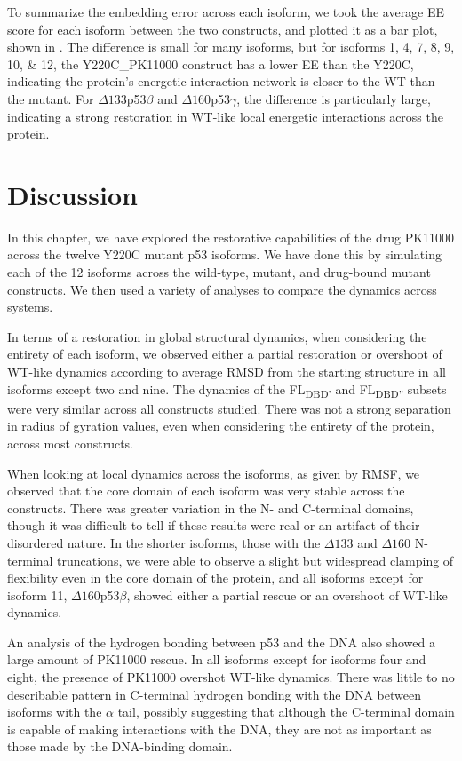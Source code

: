 To summarize the embedding error across each isoform, we took the average EE score for each isoform between the two constructs, and plotted it as a bar plot, shown in . The difference is small for many isoforms, but for isoforms \numlist{1;4;7;8;9;10;12}, the Y220C\_PK11000 construct has a lower EE than the Y220C, indicating the protein's energetic interaction network is closer to the WT than the mutant. For \(\Delta133\)p53\(\beta\) and \(\Delta160\)p53\(\gamma\), the difference is particularly large, indicating a strong restoration in WT-like local energetic interactions across the protein.

\section{Discussion}

In this chapter, we have explored the restorative capabilities of the drug PK11000 across the twelve Y220C mutant p53 isoforms. We have done this by simulating each of the 12 isoforms across the wild-type, mutant, and drug-bound mutant constructs. We then used a variety of analyses to compare the dynamics across systems.

In terms of a restoration in global structural dynamics, when considering the entirety of each isoform, we observed either a partial restoration or overshoot of WT-like dynamics according to average RMSD from the starting structure in all isoforms except two and nine. The dynamics of the FL\textbar\textsubscript{DBD'} and FL\textbar\textsubscript{DBD''} subsets were very similar across all constructs studied. There was not a strong separation in radius of gyration values, even when considering the entirety of the protein, across most constructs.

When looking at local dynamics across the isoforms, as given by RMSF, we observed that the core domain of each isoform was very stable across the constructs. There was greater variation in the N- and C-terminal domains, though it was difficult to tell if these results were real or an artifact of their disordered nature. In the shorter isoforms, those with the \(\Delta133\) and \(\Delta160\) N-terminal truncations, we were able to observe a slight but widespread clamping of flexibility even in the core domain of the protein, and all isoforms except for isoform 11, \(\Delta160\)p53\(\beta\), showed either a partial rescue or an overshoot of WT-like dynamics.

An analysis of the hydrogen bonding between p53 and the DNA also showed a large amount of PK11000 rescue. In all isoforms except for isoforms four and eight, the presence of PK11000 overshot WT-like dynamics. There was little to no describable pattern in C-terminal hydrogen bonding with the DNA between isoforms with the \(\alpha\) tail, possibly suggesting that although the C-terminal domain is capable of making interactions with the DNA, they are not as important as those made by the DNA-binding domain.

